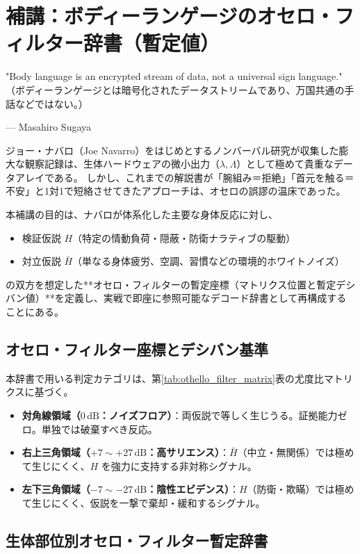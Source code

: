 \appendix
\chapter{補講：ボディーランゲージのオセロ・フィルター辞書（暫定値）}
\epigraph{"Body language is an encrypted stream of data, not a universal sign language."\\
\small（ボディーランゲージとは暗号化されたデータストリームであり、万国共通の手話などではない。）}{--- Masahiro Sugaya}
ジョー・ナバロ（Joe Navarro）をはじめとするノンバーバル研究が収集した膨大な観察記録は、生体ハードウェアの微小出力（$\lambda, \Lambda$）として極めて貴重なデータアレイである。
しかし、これまでの解説書が「腕組み＝拒絶」「首元を触る＝不安」と1対1で短絡させてきたアプローチは、オセロの誤謬の温床であった。

本補講の目的は、ナバロが体系化した主要な身体反応に対し、
\begin{itemize}
  \item 検証仮説 $H$（特定の情動負荷・隠蔽・防衛ナラティブの駆動）
  \item 対立仮説 $\bar{H}$（単なる身体疲労、空調、習慣などの環境的ホワイトノイズ）
\end{itemize}
の双方を想定した**オセロ・フィルターの暫定座標（マトリクス位置と暫定デシバン値）**を定義し、実戦で即座に参照可能なデコード辞書として再構成することにある。

\section{オセロ・フィルター座標とデシバン基準}
本辞書で用いる判定カテゴリは、第\ref{tab:othello_filter_matrix}表の尤度比マトリクスに基づく。
\begin{itemize}
  \item \textbf{対角線領域（$0\,\mathrm{dB}$：ノイズフロア）}：両仮説で等しく生じうる。証拠能力ゼロ。単独では破棄すべき反応。
  \item \textbf{右上三角領域（$+7 \sim +27\,\mathrm{dB}$：高サリエンス）}：$\bar{H}$（中立・無関係）では極めて生じにくく、$H$ を強力に支持する非対称シグナル。
  \item \textbf{左下三角領域（$-7 \sim -27\,\mathrm{dB}$：陰性エビデンス）}：$H$（防衛・欺瞞）では極めて生じにくく、仮説を一撃で棄却・緩和するシグナル。
\end{itemize}

\section{生体部位別オセロ・フィルター暫定辞書}

